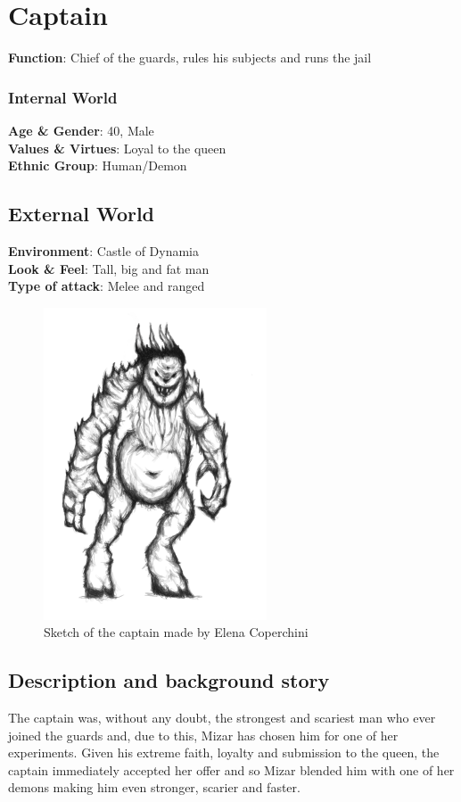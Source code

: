 \section{Captain}

\begin{minipage}{0.5\textwidth}
\textbf{Function}: Chief of the guards, rules his subjects and runs the jail

\subsubsection{Internal World}

\textbf{Age \& Gender}: 40, Male \\
\textbf{Values \& Virtues}: Loyal to the queen\\
\textbf{Ethnic Group}: Human/Demon

\subsection{External World}
\textbf{Environment}: Castle of Dynamia \\
\textbf{Look \& Feel}: Tall, big and fat man\\
\textbf{Type of attack}: Melee and ranged \\
\end{minipage}%
%
\hfill\begin{minipage}{0.4\textwidth}
  \begin{figure}[H]
  \includegraphics{Images/Enemies/captain_portrait}
   \caption{Sketch of the captain made by Elena Coperchini}
  \end{figure}
\end{minipage}


\subsection{Description and background story}
The captain was, without any doubt, the strongest and scariest man who ever joined the guards and, due to this, Mizar has chosen him for one of her experiments. Given his extreme faith, loyalty and submission to the queen, the captain immediately accepted her offer and so Mizar blended him with one of her demons making him even stronger, scarier and faster.

